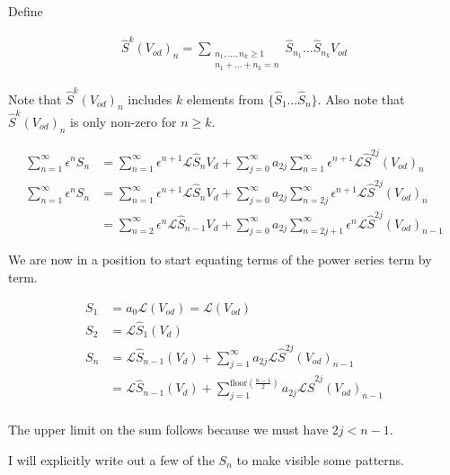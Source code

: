 \documentclass[12pt]{article}
\begin{document}
Define

\begin{align}
\hat{S}^k(V_{od})_n = \sum_{\substack{n_1,\ldots,n_k\ge 1\\n_1+\ldots+n_k=n}} \hat{S}_{n_1}\ldots \hat{S}_{n_k} V_{od}
\end{align}

Note that $\hat{S}^k(V_{od})_n$ includes $k$ elements from $\{\hat{S}_1\ldots \hat{S}_n\}$.
Also note that $\hat{S}^k(V_{od})_n$ is only non-zero for $n \ge k$.

\begin{equation}
\begin{split}
\sum_{n=1}^{\infty} \epsilon^n S_n &= \sum_{n=1}^{\infty} \epsilon^{n+1} \mathcal{L}\hat{S}_n V_d + \sum_{j=0}^{\infty} a_{2j} \sum_{n=1}^{\infty} \epsilon^{n+1} \mathcal{L} \hat{S}^{2j}(V_{od})_n\\
\sum_{n=1}^{\infty} \epsilon^n S_n &= \sum_{n=1}^{\infty} \epsilon^{n+1} \mathcal{L}\hat{S}_n V_d + \sum_{j=0}^{\infty} a_{2j} \sum_{n=2j}^{\infty} \epsilon^{n+1} \mathcal{L} \hat{S}^{2j}(V_{od})_n\\
&= \sum_{n=2}^{\infty} \epsilon^{n} \mathcal{L}\hat{S}_{n-1} V_d + \sum_{j=0}^{\infty} a_{2j} \sum_{n=2j+1}^{\infty} \epsilon^{n} \mathcal{L} \hat{S}^{2j}(V_{od})_{n-1}
\end{split}
\end{equation}

We are now in a position to start equating terms of the power series term by term.

\begin{align}
S_1 &= a_0 \mathcal{L}(V_{od}) = \mathcal{L}(V_{od})\\
S_2 &= \mathcal{L}\hat{S}_1(V_d)\\
S_n &=  \mathcal{L}\hat{S}_{n-1}(V_d) + \sum_{j=1}^{\infty}a_{2j} \mathcal{L}\hat{S}^{2j}(V_{od})_{n-1}\\
&= \mathcal{L}\hat{S}_{n-1}(V_d) + \sum_{j=1}^{\text{floor}\left(\frac{n-1}{2}\right)}a_{2j} \mathcal{L}\hat{S}^{2j}(V_{od})_{n-1}\\
\end{align}

The upper limit on the sum follows because we must have $2j < n-1$.

I will explicitly write out a few of the $S_n$ to make visible some patterns.
\end{document}
